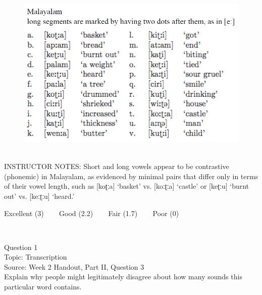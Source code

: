 \documentclass[12pt]{article}
\begin{document}
\begin{figure}[H]
\includegraphics{../images/malayalam.png}
\end{figure}

~\\
INSTRUCTOR NOTES: Short and long vowels appear to be contrastive (phonemic) in Malayalam, as evidenced by minimal pairs that differ only in terms of their vowel length, such as [koʈːa] ‘basket’ vs. [koːʈːa] ‘castle’ or [keʈːu] ‘burnt out’ vs. [keːʈːu] ‘heard.’


\vfill
Excellent (3) ~~~ Good (2.2) ~~~ Fair (1.7) ~~~ Poor (0)
\newpage

\begin{center}
\textbf{{\color{red}{\HUGE END OF EXAM}}}\\

\end{center}
\newpage

\begin{center}
\textbf{{\color{blue}{\HUGE START OF EXAM\\}}}

\textbf{{\color{blue}{\HUGE Student ID: 60467\\}}}

\textbf{{\color{blue}{\HUGE \\}}}

\end{center}
\newpage

{\large Question 1}\\

Topic: Transcription\\
Source: Week 2 Handout, Part II, Question 3\\

Explain why people might legitimately disagree about how many sounds this particular word contains.\\
\end{document}

